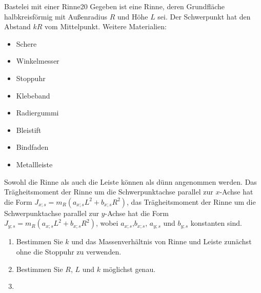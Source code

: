\begin{problem}{Bastelei mit einer Rinne}{20}
Gegeben ist eine Rinne, deren Grundfläche halbkreisförmig mit Außenradius $R$ und  Höhe $L$ sei. Der Schwerpunkt hat den Abstand $kR$ vom Mittelpunkt. Weitere Materialien:
 \begin{itemize}
  \item Schere
  \item Winkelmesser
  \item Stoppuhr
  \item Klebeband
  \item Radiergummi
  \item Bleistift
  \item Bindfaden
  \item Metallleiste
 \end{itemize}
Sowohl die Rinne als auch die Leiste können als dünn angenommen werden. Das Trägheitsmoment der Rinne um die Schwerpunktachse parallel zur $x$-Achse hat die Form $J_{x;s}=m_R(a_{x;s}L^2+b_{x;s}R^2)$, das Trägheitsmoment der Rinne um die Schwerpunktachse parallel zur $y$-Achse hat die Form $J_{y;s}=m_R(a_{x;s}L^2+b_{x;s}R^2)$, wobei $a_{x;s}$,$b_{x;s} $, $a_{y;s}$ und $b_{y;s}$ konstanten sind.
 \begin{enumerate}
  \item Bestimmen Sie $k$ und das Massenverhältnis von Rinne und Leiste zunächst ohne die Stoppuhr zu verwenden.
  \item Bestimmen Sie $R$, $L$ und $k$ möglichst genau.
  \item
 \end{enumerate}
\end{problem}

